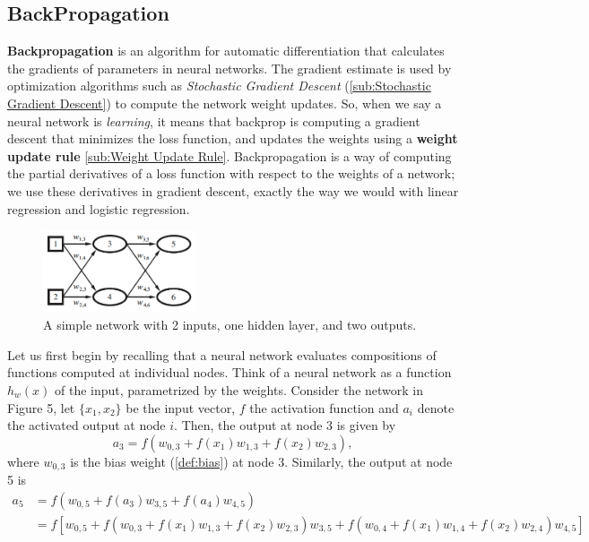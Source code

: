 \documentclass{article}
\begin{document}
\subsection{BackPropagation}%
  \label{sub:BackPropagation}
\textbf{Backpropagation} is an algorithm for automatic differentiation that calculates the gradients of parameters in neural networks. The gradient estimate is used by optimization algorithms such as \textit{Stochastic Gradient Descent} (\autoref{sub:Stochastic Gradient Descent}) to compute the network weight updates. So, when we say a neural network is \textit{learning}, it means that backprop is computing a gradient descent that minimizes the loss function, and updates the weights using a \textbf{weight update rule} \ref{sub:Weight Update Rule}. Backpropagation is a way of computing the partial derivatives of a loss function with respect to the weights of a network; we use these derivatives in gradient descent, exactly the way we would with linear regression and logistic regression. 
\begin{figure} %
    \centering
    \label{simpleNet}
    \includegraphics[width=0.4\textwidth]{simpleNet}
    \caption{A simple network with 2 inputs, one hidden layer, and two outputs.}
\end{figure}
  Let us first begin by recalling that a neural network evaluates compositions of functions computed at individual nodes. Think of a neural network as a function $h_w(x)$ of the input, parametrized by the weights. Consider the network in Figure 5, let $\{x_1,x_2\}$ be the input vector, $f$ the activation function and $a_i$ denote the activated output at node $i$. Then, the output at node 3 is given by
  $$a_3 = f(w_{0, 3} + f(x_1)w_{1,3} + f(x_2)w_{2,3}), $$
  where $w_{0,3}$ is the bias weight (\autoref{def:bias}) at node 3. Similarly, the output at node 5 is
  \begin{equation*}
    \begin{split}
      a_5 &= f( w_{0,5} + f(a_3) w_{3,5} + f(a_4) w_{4,5}  )\\ 
      &= f[w_{0,5} + f(w_{0, 3} + f(x_1)w_{1,3} + f(x_2)w_{2,3})w_{3,5} +f(w_{0, 4} + f(x_1)w_{1,4} + f(x_2)w_{2,4})w_{4,5} ]
    \end{split}
  \end{equation*}
\end{document}
